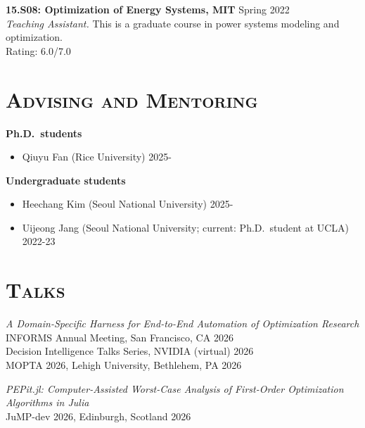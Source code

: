 \documentclass[margin,line,pifont]{./FontsAndCls/custom_res}
\begin{document}
\begin{resume}
{\textbf{15.S08: Optimization of Energy Systems, MIT} }  \hfill Spring 2022 \\
\textit{Teaching Assistant.} This is a graduate course in power systems modeling and optimization. \\
{\sc Rating:} 6.0/7.0

\section{ \bfseries\scshape Advising and Mentoring}

\noindent \begin{minipage} {\textwidth}
\textbf{Ph.D.\ students}\\
\begin{itemize}
\item Qiuyu Fan (Rice University) \hfill 2025-
\end{itemize}
\end{minipage}

\noindent \begin{minipage} {\textwidth}
\textbf{Undergraduate students}\\
\begin{itemize}
\item Heechang Kim (Seoul National University) \hfill 2025-
\item Uijeong Jang (Seoul National University; current: Ph.D.\ student at UCLA) \hfill 2022-23
\end{itemize}
\end{minipage}






\section{ \bfseries\scshape Talks}

\noindent \begin{minipage} {\textwidth}
\textit{A Domain-Specific Harness for End-to-End Automation of Optimization Research} \\
INFORMS Annual Meeting, San Francisco, CA \hfill 2026 \\
Decision Intelligence Talks Series, NVIDIA (virtual) \hfill 2026 \\
MOPTA 2026, Lehigh University, Bethlehem, PA \hfill 2026
\end{minipage}

\noindent \begin{minipage} {\textwidth}
\textit{PEPit.jl: Computer-Assisted Worst-Case Analysis of First-Order Optimization Algorithms in Julia} \\
JuMP-dev 2026, Edinburgh, Scotland \hfill 2026
\end{minipage}


\end{resume}
\end{document}
